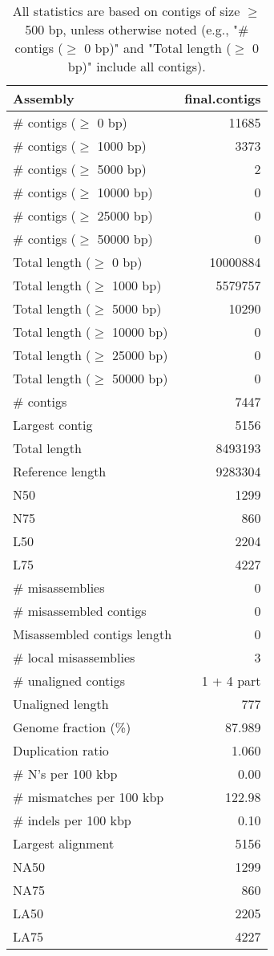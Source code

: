 \documentclass[12pt,a4paper]{article}
\begin{document}
\begin{table}[ht]
\begin{center}
\caption{All statistics are based on contigs of size $\geq$ 500 bp, unless otherwise noted (e.g., "\# contigs ($\geq$ 0 bp)" and "Total length ($\geq$ 0 bp)" include all contigs).}
\begin{tabular}{|l*{1}{|r}|}
\hline
Assembly & final.contigs \\ \hline
\# contigs ($\geq$ 0 bp) & 11685 \\ \hline
\# contigs ($\geq$ 1000 bp) & 3373 \\ \hline
\# contigs ($\geq$ 5000 bp) & 2 \\ \hline
\# contigs ($\geq$ 10000 bp) & 0 \\ \hline
\# contigs ($\geq$ 25000 bp) & 0 \\ \hline
\# contigs ($\geq$ 50000 bp) & 0 \\ \hline
Total length ($\geq$ 0 bp) & 10000884 \\ \hline
Total length ($\geq$ 1000 bp) & 5579757 \\ \hline
Total length ($\geq$ 5000 bp) & 10290 \\ \hline
Total length ($\geq$ 10000 bp) & 0 \\ \hline
Total length ($\geq$ 25000 bp) & 0 \\ \hline
Total length ($\geq$ 50000 bp) & 0 \\ \hline
\# contigs & 7447 \\ \hline
Largest contig & 5156 \\ \hline
Total length & 8493193 \\ \hline
Reference length & 9283304 \\ \hline
N50 & 1299 \\ \hline
N75 & 860 \\ \hline
L50 & 2204 \\ \hline
L75 & 4227 \\ \hline
\# misassemblies & 0 \\ \hline
\# misassembled contigs & 0 \\ \hline
Misassembled contigs length & 0 \\ \hline
\# local misassemblies & 3 \\ \hline
\# unaligned contigs & 1 + 4 part \\ \hline
Unaligned length & 777 \\ \hline
Genome fraction (\%) & 87.989 \\ \hline
Duplication ratio & 1.060 \\ \hline
\# N's per 100 kbp & 0.00 \\ \hline
\# mismatches per 100 kbp & 122.98 \\ \hline
\# indels per 100 kbp & 0.10 \\ \hline
Largest alignment & 5156 \\ \hline
NA50 & 1299 \\ \hline
NA75 & 860 \\ \hline
LA50 & 2205 \\ \hline
LA75 & 4227 \\ \hline
\end{tabular}
\end{center}
\end{table}
\end{document}

